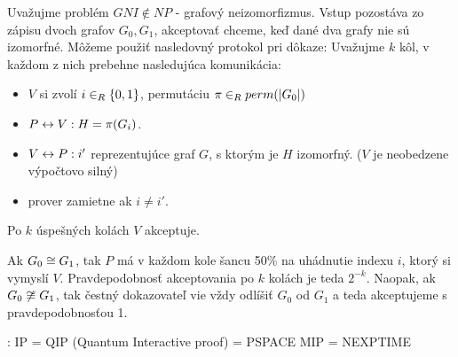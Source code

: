 \begin{priklad}
    Uvažujme problém $GNI \not \in NP$ - grafový neizomorfizmus.
    Vstup pozostáva zo zápisu dvoch grafov $G_0, G_1$, akceptovať chceme, keď
    dané dva grafy nie sú izomorfné. Môžeme použiť nasledovný protokol
    pri dôkaze: Uvažujme $k$ kôl, v každom z nich prebehne nasledujúca
    komunikácia:
    \begin{itemize}
        \item $V$ si zvolí $i \in_{R} \{0,1\}$, permutáciu
         $\pi \in_{R} perm(|G_0|)$
        \item $P \leftrightarrow V: H = \pi(G_i)$.
        \item $V \leftrightarrow P: i'$ reprezentujúce graf $G$, s ktorým je $H$
        izomorfný. ($V$ je neobedzene výpočtovo silný)
        \item prover zamietne ak $i \not = i'$.
    \end{itemize}
    Po $k$ úspešných kolách $V$ akceptuje.

    Ak $G_0 \cong G_1$, tak $P$ má v každom kole šancu 50\% na
    uhádnutie indexu $i$, ktorý si vymyslí $V$. 
    Pravdepodobnosť akceptovania po $k$ kolách je teda $2^{-k}$.
    Naopak, ak $G_0 \not \cong G_1$, tak čestný dokazovateľ vie
    vždy odlíšiť $G_0$ od $G_1$ a teda akceptujeme s pravdepodobnosťou 1.
\end{priklad}

:
IP = QIP (Quantum Interactive proof) = PSPACE
MIP = NEXPTIME

